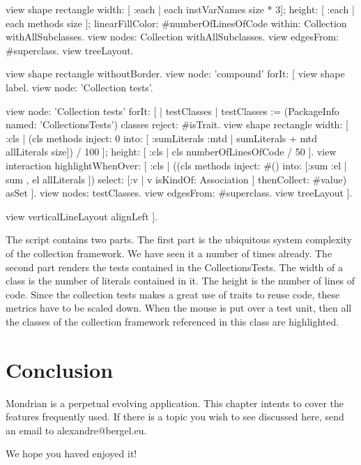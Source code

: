 \documentclass[a4paper,10pt,twoside]{book}
\begin{document}
\begin{code}{}
view shape rectangle
  width: [ :each | each instVarNames size * 3];
  height: [ :each | each methods size ];
  linearFillColor: #numberOfLinesOfCode within: Collection withAllSubclasses.
view nodes: Collection withAllSubclasses.
view edgesFrom: #superclass.
view treeLayout.

view shape rectangle withoutBorder.
view node: 'compound' forIt: [
  view shape label.
  view node: 'Collection tests'.
  
  view node: 'Collection tests' forIt: [
    | testClasses |
    testClasses := (PackageInfo named: 'CollectionsTests') classes reject: #isTrait.
    view shape rectangle
      width: [ :cls | (cls methods inject: 0 into: [ :sumLiterals :mtd | sumLiterals + mtd allLiterals size]) / 100 ];
      height: [ :cls | cls numberOfLinesOfCode / 50 ].
    view interaction 
        highlightWhenOver: [ :cls | ((cls methods inject: #() 
                        into: [:sum :el | sum , el allLiterals ]) select: [:v | v isKindOf: Association ] thenCollect: #value) asSet ].
    view nodes: testClasses.
    view edgesFrom: #superclass.
    view treeLayout ].
  
  view verticalLineLayout alignLeft
].
\end{code}

The script contains two parts. The first part is the ubiquitous system complexity of the collection framework. We have seen it a number of times already. The second part renders the tests contained in the CollectionsTests. The width of a class is the number of literals contained in it. The height is the number of lines of code. Since the collection tests makes a great use of traits to reuse code, these metrics have to be scaled down. When the mouse is put over a test unit, then all the classes of the collection framework referenced in this class are highlighted.

\section{Conclusion}
Mondrian is a perpetual evolving application. This chapter intents to cover the features frequently used. If there is a topic you wish to see discussed here, send an email to alexandre@bergel.eu.

We hope you haved enjoyed it!



\ifx\wholebook\relax\else
   
   
\end{document}
